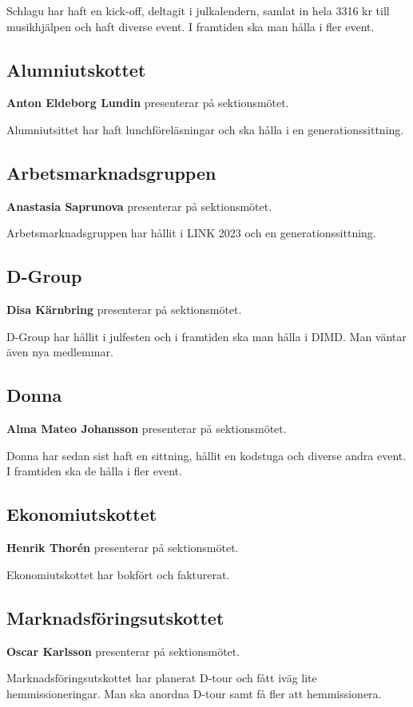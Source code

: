 \documentclass[../protokoll-vintermote-2024.tex]{subfiles}
\begin{document}
Schlagu har haft en kick-off, deltagit i julkalendern, samlat in hela 3316 kr till musikhjälpen och haft diverse event. I framtiden ska man hålla i fler event.

\subsection{Alumniutskottet}
\textbf{Anton Eldeborg Lundin} presenterar på sektionsmötet. 

Alumniutsittet har haft lunchföreläsningar och ska hålla i en generationssittning.

\subsection{Arbetsmarknadsgruppen}
\textbf{Anastasia Saprunova} presenterar på sektionsmötet. 

Arbetsmarknadsgruppen har hållit i LINK 2023 och en generationssittning.

\subsection{D-Group}
\textbf{Disa Kärnbring} presenterar på sektionsmötet.

D-Group har hållit i julfesten och i framtiden ska man hålla i DIMD. Man väntar även nya medlemmar.

\subsection{Donna}
\textbf{Alma Mateo Johansson} presenterar på sektionsmötet.

Donna har sedan sist haft en sittning, hållit en kodstuga och diverse andra event. I framtiden ska de hålla i fler event.

\subsection{Ekonomiutskottet}
\textbf{Henrik Thorén} presenterar på sektionsmötet.

Ekonomiutskottet har bokfört och fakturerat.

\subsection{Marknadsföringsutskottet}
\textbf{Oscar Karlsson} presenterar på sektionsmötet.

Marknadsföringsutskottet har planerat D-tour och fått iväg lite hemmissioneringar. Man ska anordna D-tour samt få fler att hemmissionera.
\end{document}
